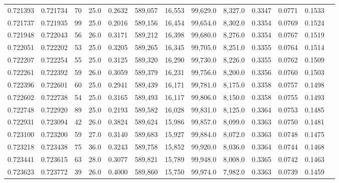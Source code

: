 \begin{tabular}{rrrrrrrrrrrrr}
0.721393 & 0.721734 &    70 & 25.0 &                                     0.2632 & 589,057 &  16,553 &  99,629.0 &   8,327.0 & 0.3347 & 0.0771 & 0.1533 \\
0.721737 & 0.721935 &    99 & 25.0 &                                     0.2016 & 589,156 &  16,454 &  99,654.0 &   8,302.0 & 0.3354 & 0.0769 & 0.1524 \\
0.721948 & 0.722043 &    56 & 26.0 &                                     0.3171 & 589,212 &  16,398 &  99,680.0 &   8,276.0 & 0.3354 & 0.0767 & 0.1519 \\
0.722051 & 0.722202 &    53 & 25.0 &                                     0.3205 & 589,265 &  16,345 &  99,705.0 &   8,251.0 & 0.3355 & 0.0764 & 0.1514 \\
0.722207 & 0.722254 &    55 & 25.0 &                                     0.3125 & 589,320 &  16,290 &  99,730.0 &   8,226.0 & 0.3355 & 0.0762 & 0.1509 \\
0.722261 & 0.722392 &    59 & 26.0 &                                     0.3059 & 589,379 &  16,231 &  99,756.0 &   8,200.0 & 0.3356 & 0.0760 & 0.1503 \\
0.722396 & 0.722601 &    60 & 25.0 &                                     0.2941 & 589,439 &  16,171 &  99,781.0 &   8,175.0 & 0.3358 & 0.0757 & 0.1498 \\
0.722602 & 0.722738 &    54 & 25.0 &                                     0.3165 & 589,493 &  16,117 &  99,806.0 &   8,150.0 & 0.3358 & 0.0755 & 0.1493 \\
0.722748 & 0.722920 &    89 & 25.0 &                                     0.2193 & 589,582 &  16,028 &  99,831.0 &   8,125.0 & 0.3364 & 0.0753 & 0.1485 \\
0.722931 & 0.723094 &    42 & 26.0 &                                     0.3824 & 589,624 &  15,986 &  99,857.0 &   8,099.0 & 0.3363 & 0.0750 & 0.1481 \\
0.723100 & 0.723200 &    59 & 27.0 &                                     0.3140 & 589,683 &  15,927 &  99,884.0 &   8,072.0 & 0.3363 & 0.0748 & 0.1475 \\
0.723218 & 0.723438 &    75 & 36.0 &                                     0.3243 & 589,758 &  15,852 &  99,920.0 &   8,036.0 & 0.3364 & 0.0744 & 0.1468 \\
0.723441 & 0.723615 &    63 & 28.0 &                                     0.3077 & 589,821 &  15,789 &  99,948.0 &   8,008.0 & 0.3365 & 0.0742 & 0.1463 \\
0.723623 & 0.723772 &    39 & 26.0 &                                     0.4000 & 589,860 &  15,750 &  99,974.0 &   7,982.0 & 0.3363 & 0.0739 & 0.1459 \\

\end{tabular}
